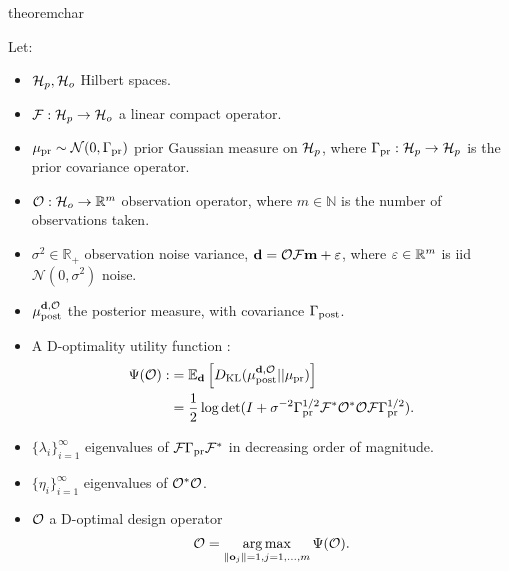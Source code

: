 \begin{restatable}{theorem}{char}\label{thm:char}

  Let:
  \begin{itemize}
  \item $\mathcal{H}_p, \mathcal{H}_o$ Hilbert spaces.
  \item $\mathcal{F}:\mathcal{H}_p \to \mathcal{H}_o$ a linear compact operator.
  \item $\mu_{\textup{pr}} \sim \mathcal{N}(0, \Gamma_{\textup{pr}})$ prior Gaussian measure on $\mathcal{H}_p$,
    where $\Gamma_{\textup{pr}}:\mathcal{H}_p \to \mathcal{H}_p$ is the prior covariance operator.
  \item $\mathcal{O}: \mathcal{H}_o \to \mathbb{R}^m$ observation operator, where $m
    \in \mathbb{N}$ is the number of observations taken. 
  \item $\sigma^2 \in \mathbb{R}_{+}$ observation noise variance,
    $\mathbf{d} = \mathcal{O} \mathcal{F} \mathbf{m} + \varepsilon$, where $\varepsilon \in \mathbb{R}^m$
    is iid $\mathcal{N}(0, \sigma^2)$ noise.
  \item $\mu_{\textup{post}}^{\mathbf{d}, \mathcal{O}}$ the posterior measure, with covariance $\Gamma_{\textup{post}}$.
  \item A D-optimality utility function
    \cite{AlexanderianGloorGhattas14}:
    \begin{align*}
      \begin{split}
        \tar(\obs) :&= \mathbb{E}_{\data}\left [ D_{\text{KL}} (\post || \pr ) \right ] \\
        &= \frac12 \log \det ( I + \sigma^{-2} \prcov^{1/2} \fwd ^*
        \obs^* \obs \fwd \prcov^{1/2}).
      \end{split}
    \end{align*}
  \item $\{\lambda_i\}_{i=1}^\infty$ eigenvalues of $\mathcal{F}\Gamma_{\textup{pr}}\mathcal{F}^*$
    in decreasing order of magnitude.
  \item $\{\eta_i\}_{i=1}^\infty$ eigenvalues of $\mathcal{O}^*\mathcal{O}$.
  \item $\mathcal{O}$ a D-optimal design operator
    \begin{equation*}
      \obs = \argmax_{\|\meas_j\| = 1, j=1,\dots,m}\tar(\obs).
    \end{equation*}
  \end{itemize}


\end{restatable}
